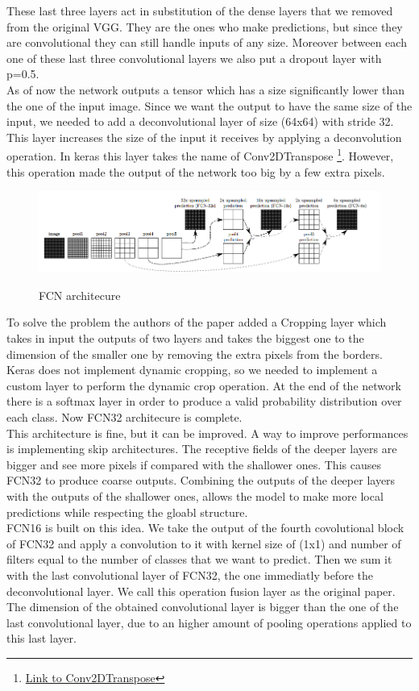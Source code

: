 \documentclass[10pt,twocolumn,letterpaper]{article}
\begin{document}
These last three layers act in substitution of the dense layers that we removed from the original VGG. They are the ones who make predictions, but since they are convolutional they can still handle inputs of any size.
Moreover between each one of these last three convolutional layers we also put a dropout layer with p=0.5.\\
As of now the network outputs a tensor which has a size significantly lower than the one of the input image. Since we want the output to have the same size of the input, we needed to add a deconvolutional layer of size (64x64) with stride 32. This layer increases the size of the input it receives by applying a deconvolution operation. In keras this layer takes the name of Conv2DTranspose \footnote{\href{https://www.tensorflow.org/api_docs/python/tf/keras/layers/Conv2DTranspose}{Link to Conv2DTranspose}}. However, this operation made the output of the network too big by a few extra pixels.\\
\begin{figure}
	\includegraphics[width=\textwidth]{image/fcn}
	\label{fcn}
	\centering
	\caption{FCN architecure}
\end{figure}
To solve the problem the authors of the paper added a Cropping layer which takes in input the outputs of two layers and takes the biggest one to the dimension of the smaller one by removing the extra pixels from the borders. Keras does not implement dynamic cropping, so we needed to implement a custom layer to perform the dynamic crop operation. At the end of the network there is a softmax layer in order to produce a valid probability distribution over each class.
Now FCN32 architecure is complete. \\
This architecture is fine, but it can be improved. A way to improve performances is implementing skip architectures. The receptive fields of the deeper layers are bigger and see more pixels if compared with the shallower ones. This causes FCN32 to produce coarse outputs. Combining the outputs of the deeper layers with the outputs of the shallower ones, allows the model to make more local predictions while respecting the gloabl structure. \\
FCN16 is built on this idea. We take the output of the fourth covolutional block of FCN32 and apply a convolution to it with kernel size of (1x1) and number of filters equal to the number of classes that we want to predict. Then we sum it with the last convolutional layer of FCN32, the one immediatly before the deconvolutional layer. We call this operation fusion layer as the original paper. The dimension of the obtained convolutional layer is bigger than the one of the last convolutional layer, due to an higher amount of pooling operations applied to this last layer. 
\end{document}
